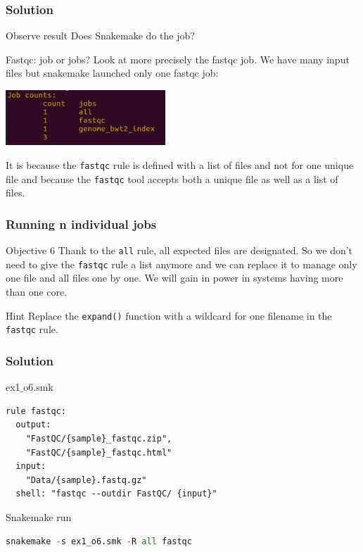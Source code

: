 \begin{frame}[containsverbatim]
\frametitle{Solution}
\begin{exampleblock}{Observe result}
Does Snakemake do the job?\\
\end{exampleblock}
\begin{exampleblock}{Fastqc: job or jobs?}
Look at more precisely the fastqc job. We have many input files but snakemake launched only one fastqc job:
\begin{center}
    \includegraphics[width=6cm]{03_workflow/images/FAIR_ex1_o5_smk.png}
\end{center}
It is because the \verb|fastqc| rule is defined with a list of files and not for one unique file and because the \verb|fastqc| tool accepts both a unique file as well as a list of files.
\end{exampleblock}
\end{frame}
\begin{frame}[containsverbatim]
\frametitle{Running n individual jobs}
\begin{exampleblock}{Objective 6}
Thank to the \verb|all| rule, all expected files are designated. So we don't need to give the \verb|fastqc| rule a list anymore and we can replace it to manage only one file and all files one by one. We will gain in power in systems having more than one core.
\end{exampleblock}
\begin{exampleblock}{Hint}
Replace the \verb|expand()| function with a wildcard for one filename in the \verb|fastqc| rule.
\end{exampleblock}
\end{frame}
\begin{frame}[containsverbatim]
\frametitle{Solution}
\begin{exampleblock}{ex1$\_$o6.smk}
\begin{lstlisting}
rule fastqc:
  output:
    "FastQC/{sample}_fastqc.zip",
    "FastQC/{sample}_fastqc.html"
  input:
    "Data/{sample}.fastq.gz"
  shell: "fastqc --outdir FastQC/ {input}"
\end{lstlisting}
\end{exampleblock}
\begin{exampleblock}{Snakemake run}
\begin{lstlisting}[language=python]
snakemake -s ex1_o6.smk -R all fastqc
\end{lstlisting}
\end{exampleblock}
\end{frame}
